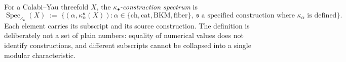 \begin{definition}
\label{def:kappa-spectrum}
For a Calabi--Yau threefold $X$, the \emph{$\kappa_\bullet$-construction spectrum} is
\[
 \operatorname{Spec}_{\kappa_\bullet}(X)
 \;:=\;
 \bigl\{(\alpha, \kappa_\alpha^{\mathfrak{s}}(X)) :
 \alpha \in \{\mathrm{ch},\mathrm{cat},\mathrm{BKM},\mathrm{fiber}\},
 \ \mathfrak{s}\text{ a specified construction where }\kappa_\alpha
 \text{ is defined}\bigr\}.
\]
Each element carries its subscript and its source construction. The
definition is deliberately not a set of plain numbers: equality of
numerical values does not identify constructions, and different
subscripts cannot be collapsed into a single modular characteristic.
\end{definition}

